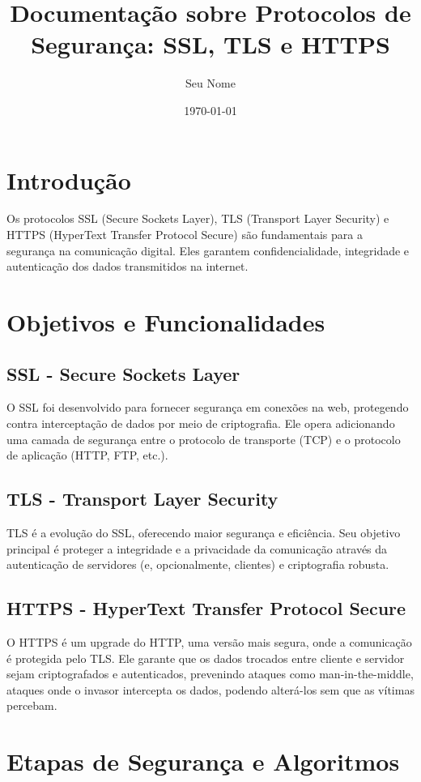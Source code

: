 \documentclass[a4paper,12pt]{article}
\title{Documentação sobre Protocolos de Segurança: SSL, TLS e HTTPS}
\author{Seu Nome}
\date{\today}
\begin{document}
\maketitle

\section{Introdução}
Os protocolos SSL (Secure Sockets Layer), TLS (Transport Layer Security) e HTTPS (HyperText Transfer Protocol Secure) são fundamentais para a segurança na comunicação digital. Eles garantem confidencialidade, integridade e autenticação dos dados transmitidos na internet.

\section{Objetivos e Funcionalidades}

\subsection{SSL - Secure Sockets Layer}
O SSL foi desenvolvido para fornecer segurança em conexões na web, protegendo contra interceptação de dados por meio de criptografia. Ele opera adicionando uma camada de segurança entre o protocolo de transporte (TCP) e o protocolo de aplicação (HTTP, FTP, etc.).

\subsection{TLS - Transport Layer Security}
TLS é a evolução do SSL, oferecendo maior segurança e eficiência. Seu objetivo principal é proteger a integridade e a privacidade da comunicação através da autenticação de servidores (e, opcionalmente, clientes) e criptografia robusta.

\subsection{HTTPS - HyperText Transfer Protocol Secure}
O HTTPS é um upgrade do HTTP, uma versão mais segura, onde a comunicação é protegida pelo TLS. Ele garante que os dados trocados entre cliente e servidor sejam criptografados e autenticados, prevenindo ataques como man-in-the-middle, ataques onde o invasor intercepta os dados, podendo alterá-los sem que as vítimas percebam.

\section{Etapas de Segurança e Algoritmos}
\end{document}
